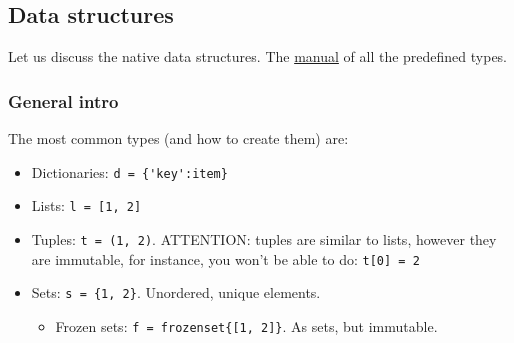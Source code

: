 \documentclass[a4paper,12pt,%
              final%
              ]{article}
\begin{document}
\subsection{Data structures}
Let us discuss the native data structures. The \href{https://docs.python.org/3/library/stdtypes.html}{manual} of all the predefined types.
\subsubsection{General intro}
The most common types (and how to create them) are:
\begin{itemize}
  \item Dictionaries: \verb|d = {'key':item}|
  \item Lists: \verb|l = [1, 2]|
  \item Tuples: \verb|t = (1, 2)|. ATTENTION: tuples are similar to lists, however they are immutable, for instance, you won't be able to do: \verb|t[0] = 2|
  \item Sets: \verb|s = {1, 2}|. Unordered, unique elements.
    \begin{itemize}
      \item Frozen sets: \verb|f = frozenset{[1, 2]}|. As sets, but immutable.
    \end{itemize}
\end{itemize}
\end{document}
